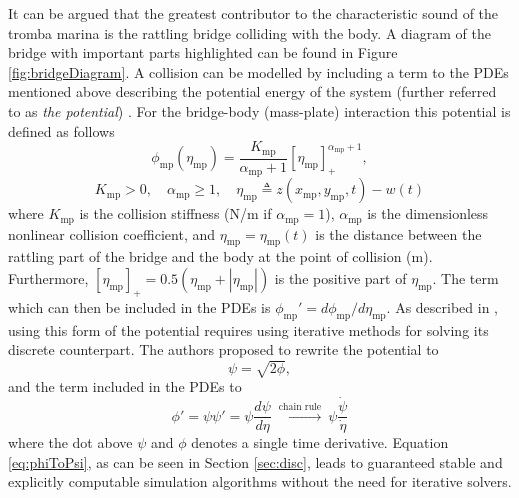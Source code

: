\documentclass[dvipsnames, pdftex]{article}
\def\SWcomment[#1]{\textcolor{Bittersweet}{#1}}
\def\MDcomment[#1]{\textcolor{Blue}{#1}}
\def\um{w}
\def\up{z}
\begin{document}
It can be argued that the greatest contributor to the characteristic sound of the tromba marina is the rattling bridge colliding with the body. A diagram of the bridge with important parts highlighted can be found in Figure \ref{fig:bridgeDiagram}. A collision can be modelled by including a term to the PDEs mentioned above describing the potential energy of the system (further referred to as \textit{the potential}) \cite{Ducceschi2019}. For the bridge-body (mass-plate) interaction this potential is defined as follows %
\begin{equation}\label{eq:potential}
    \phi_\text{mp}(\eta_\text{mp}) = \frac{K_\text{mp}}{\alpha_\text{mp}+1}[\eta_\text{mp}]_+^{\alpha_\text{mp}+1},
\end{equation}
\begin{equation*}
    K_\text{mp}>0, \quad \alpha_\text{mp}\geq 1, \quad \eta_\text{mp}\triangleq \up(x_\text{mp},y_\text{mp},t) - \um(t)
\end{equation*}
where $K_\text{mp}$ is the collision stiffness (N/m if $\alpha_\text{mp} = 1$), $\alpha_\text{mp}$ is the dimensionless nonlinear collision coefficient, and $\eta_\text{mp} = \eta_\text{mp}(t)$ is the distance between the rattling part of the bridge and the body at the point of collision (m). Furthermore, $[\eta_\text{mp}]_+ = 0.5(\eta_\text{mp}+|\eta_\text{mp}|)$ is the positive part of $\eta_\text{mp}$. The term which can then be included in the PDEs is $\phi_\text{mp}' = d\phi_\text{mp}/d\eta_\text{mp}$. As described in \cite{Falaize2016a:SMC2020, Falaize2016b:SMC2020, Lopes:SMC2020, Ducceschi2019}, using this form of the potential requires using iterative methods for solving its discrete counterpart. The authors proposed to rewrite the potential to
\begin{equation}
    \psi = \sqrt{2\phi},
\end{equation}
and the term included in the PDEs to
\begin{equation}\label{eq:phiToPsi}
    \phi' = \psi\psi' = \psi\frac{d\psi}{d\eta}\  \xrightarrow{\text{chain rule}}\ \psi\frac{\dot \psi}{\dot \eta}
\end{equation}
where the dot above $\psi$ and $\phi$ denotes a single time derivative. Equation \eqref{eq:phiToPsi}, as can be seen in Section \ref{sec:disc}, leads to guaranteed stable and explicitly computable simulation algorithms without the need for iterative solvers. 
\end{document}
